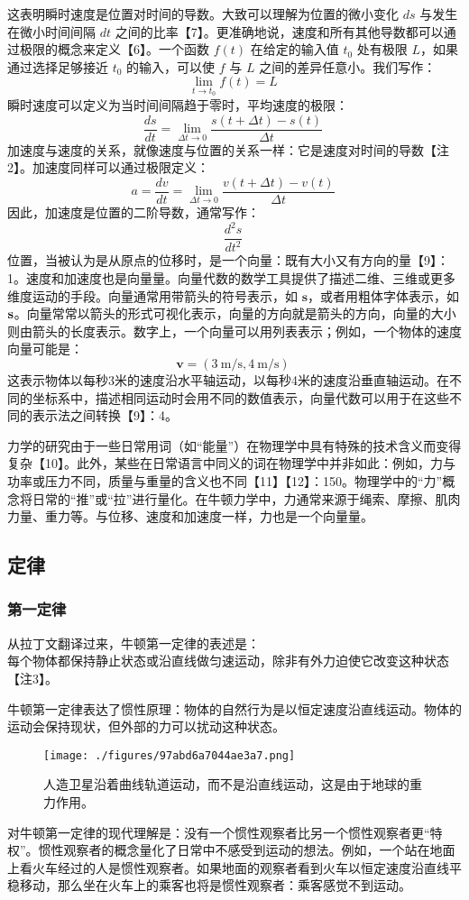 这表明瞬时速度是位置对时间的导数。大致可以理解为位置的微小变化 \( ds \) 与发生在微小时间间隔 \( dt \) 之间的比率【7】。更准确地说，速度和所有其他导数都可以通过极限的概念来定义【6】。一个函数 \( f(t) \) 在给定的输入值 \( t_0 \) 处有极限 \( L \)，如果通过选择足够接近 \( t_0 \) 的输入，可以使 \( f \) 与 \( L \) 之间的差异任意小。我们写作：
\[
\lim _{t\to t_{0}}f(t)=L~
\]
瞬时速度可以定义为当时间间隔趋于零时，平均速度的极限：
\[
\frac{ds}{dt}=\lim _{\Delta t\to 0}\frac{s(t+\Delta t)-s(t)}{\Delta t}~
\]
加速度与速度的关系，就像速度与位置的关系一样：它是速度对时间的导数【注2】。加速度同样可以通过极限定义：
\[
a=\frac{dv}{dt}=\lim _{\Delta t\to 0}\frac{v(t+\Delta t)-v(t)}{\Delta t}~
\]
因此，加速度是位置的二阶导数，通常写作：
\[
\frac{d^{2}s}{dt^{2}}~
\]
位置，当被认为是从原点的位移时，是一个向量：既有大小又有方向的量【9】：1。速度和加速度也是向量量。向量代数的数学工具提供了描述二维、三维或更多维度运动的手段。向量通常用带箭头的符号表示，如 \( \mathbf{s} \)，或者用粗体字体表示，如 \( {\bf {s}} \)。向量常常以箭头的形式可视化表示，向量的方向就是箭头的方向，向量的大小则由箭头的长度表示。数字上，一个向量可以用列表表示；例如，一个物体的速度向量可能是：
\[
\mathbf{v} = (3 \ \mathrm{m/s}, 4 \ \mathrm{m/s})~
\]
这表示物体以每秒3米的速度沿水平轴运动，以每秒4米的速度沿垂直轴运动。在不同的坐标系中，描述相同运动时会用不同的数值表示，向量代数可以用于在这些不同的表示法之间转换【9】：4。

力学的研究由于一些日常用词（如“能量”）在物理学中具有特殊的技术含义而变得复杂【10】。此外，某些在日常语言中同义的词在物理学中并非如此：例如，力与功率或压力不同，质量与重量的含义也不同【11】【12】：150。物理学中的“力”概念将日常的“推”或“拉”进行量化。在牛顿力学中，力通常来源于绳索、摩擦、肌肉力量、重力等。与位移、速度和加速度一样，力也是一个向量量。
\subsection{定律}
\subsubsection{第一定律}
从拉丁文翻译过来，牛顿第一定律的表述是：\\
每个物体都保持静止状态或沿直线做匀速运动，除非有外力迫使它改变这种状态【注3】。

牛顿第一定律表达了惯性原理：物体的自然行为是以恒定速度沿直线运动。物体的运动会保持现状，但外部的力可以扰动这种状态。
\begin{figure}[ht]
\centering
\texttt{[image: ./figures/97abd6a7044ae3a7.png]}
\caption{人造卫星沿着曲线轨道运动，而不是沿直线运动，这是由于地球的重力作用。} \label{fig_NEW01_1}
\end{figure}
对牛顿第一定律的现代理解是：没有一个惯性观察者比另一个惯性观察者更“特权”。惯性观察者的概念量化了日常中不感受到运动的想法。例如，一个站在地面上看火车经过的人是惯性观察者。如果地面的观察者看到火车以恒定速度沿直线平稳移动，那么坐在火车上的乘客也将是惯性观察者：乘客感觉不到运动。

